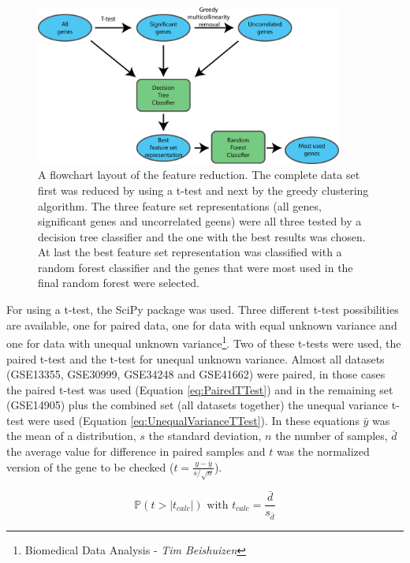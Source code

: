 \documentclass[10pt,a4paper]{article}
\begin{document}
	\begin{figure}[H]
		\includegraphics[width=0.9\textwidth]{FeatureReductionLayout.png}
		\caption{A flowchart layout of the feature reduction. The complete data set first was reduced by using a t-test and next by the greedy clustering algorithm. The three feature set representations (all genes, significant genes and uncorrelated geens) were all three tested by a decision tree classifier and the one with the best results was chosen. At last the best feature set representation was classified with a random forest classifier and the genes that were most used in the final random forest were selected.}
		\label{fig:FeatureReductionLayout}
	\end{figure}
		
	
	For using a t-test, the SciPy package was used. Three different t-test possibilities are available, one for paired data, one for data with equal unknown variance and one for data with unequal unknown variance\footnote{\label{fn:BDA}Biomedical Data Analysis - \textit{Tim Beishuizen}}. Two of these t-tests were used, the paired t-test and the t-test for unequal unknown variance. Almost all datasets (GSE13355, GSE30999, GSE34248 and GSE41662) were paired, in those cases the paired t-test was used (Equation \ref{eq:PairedTTest}) and in the remaining set (GSE14905) plus the combined set (all datasets together) the unequal variance t-test were used (Equation \ref{eq:UnequalVarianceTTest}). In these equations $\bar{y}$ was the mean of a distribution, $s$ the standard deviation, $n$ the number of samples, $\bar{d}$ the average value for difference in paired samples and $t$ was the normalized version of the gene to be checked ($t = \frac{y - \bar{y}}{s/\sqrt{n}}$).  
	
	\begin{equation}
	\label{eq:PairedTTest}
	\mathbb{P}(t > |t_{calc}|) \text{ with } t_{calc} =\frac{\bar{d}}{s_{\bar{d}}}
	\end{equation}
	
\end{document}

